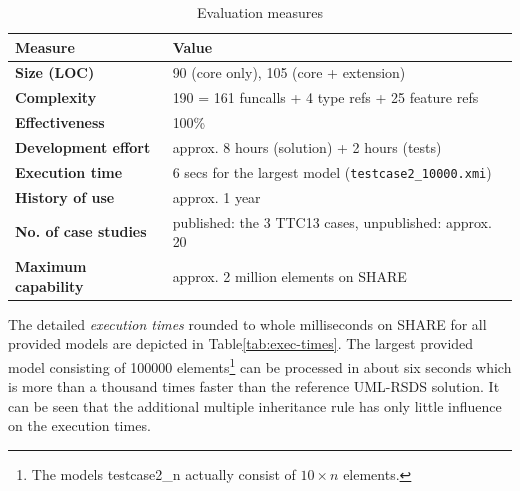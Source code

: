 \documentclass[11pt]{article}
\begin{document}
\begin{table}[htb]
  \centering
  \begin{tabular}{| l | l |}
    \hline
    \textbf{Measure}            & \textbf{Value}\\
    \hline
    \textbf{Size (LOC)}         & 90 (core only), 105 (core + extension)\\
    \textbf{Complexity}         & 190 = 161 funcalls + 4 type refs + 25 feature refs\\
    \textbf{Effectiveness}      & 100\%\\
    \textbf{Development effort} & approx. 8 hours (solution) + 2 hours (tests)\\
    \textbf{Execution time}     & 6 secs for the largest model (\verb|testcase2_10000.xmi|)\\
    \textbf{History of use}     & approx. 1 year\\
    \textbf{No. of case studies}& published: the 3 TTC13 cases, unpublished: approx. 20\\
    \textbf{Maximum capability} & approx. 2 million elements on SHARE\\
    \hline
  \end{tabular}
  \caption{Evaluation measures}
  \label{tab:evaluation}
\end{table}

The detailed \emph{execution times} rounded to whole milliseconds on SHARE for
all provided models are depicted in Table\ref{tab:exec-times}.  The largest
provided model consisting of 100000 elements\footnote{The models
  \textsf{testcase2\_n} actually consist of $10\times n$ elements.} can be
processed in about six seconds which is more than a thousand times faster than
the reference UML-RSDS solution.  It can be seen that the additional multiple
inheritance rule has only little influence on the execution times.
\end{document}
